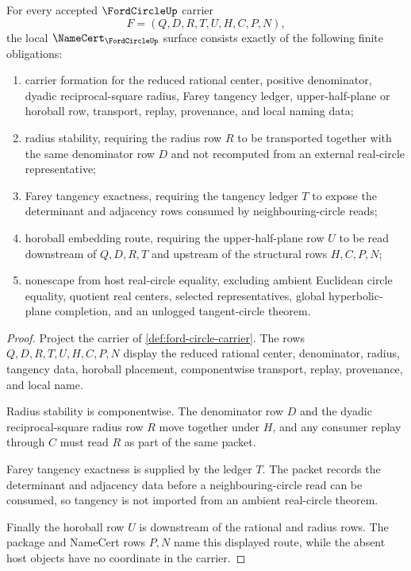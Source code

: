 \begin{theorem}\label{thm:ford-circle-namecert-obligations}
For every accepted $\FordCircleUp$ carrier
$$
F=(Q,D,R,T,U,H,C,P,N),
$$
the local $\NameCert_{\FordCircleUp}$ surface consists exactly of the following finite obligations:
\begin{enumerate}
\item carrier formation for the reduced rational center, positive denominator, dyadic reciprocal-square radius, Farey tangency ledger, upper-half-plane or horoball row, transport, replay, provenance, and local naming data;
\item radius stability, requiring the radius row $R$ to be transported together with the same denominator row $D$ and not recomputed from an external real-circle representative;
\item Farey tangency exactness, requiring the tangency ledger $T$ to expose the determinant and adjacency rows consumed by neighbouring-circle reads;
\item horoball embedding route, requiring the upper-half-plane row $U$ to be read downstream of $Q,D,R,T$ and upstream of the structural rows $H,C,P,N$;
\item nonescape from host real-circle equality, excluding ambient Euclidean circle equality, quotient real centers, selected representatives, global hyperbolic-plane completion, and an unlogged tangent-circle theorem.
\end{enumerate}
\end{theorem}
\begin{proof}
Project the carrier of \autoref{def:ford-circle-carrier}. The rows $Q,D,R,T,U,H,C,P,N$ display the reduced rational center, denominator, radius, tangency data, horoball placement, componentwise transport, replay, provenance, and local name.

Radius stability is componentwise. The denominator row $D$ and the dyadic reciprocal-square radius row $R$ move together under $H$, and any consumer replay through $C$ must read $R$ as part of the same packet.

Farey tangency exactness is supplied by the ledger $T$. The packet records the determinant and adjacency data before a neighbouring-circle read can be consumed, so tangency is not imported from an ambient real-circle theorem.

Finally the horoball row $U$ is downstream of the rational and radius rows. The package and NameCert rows $P,N$ name this displayed route, while the absent host objects have no coordinate in the carrier.
\end{proof}

